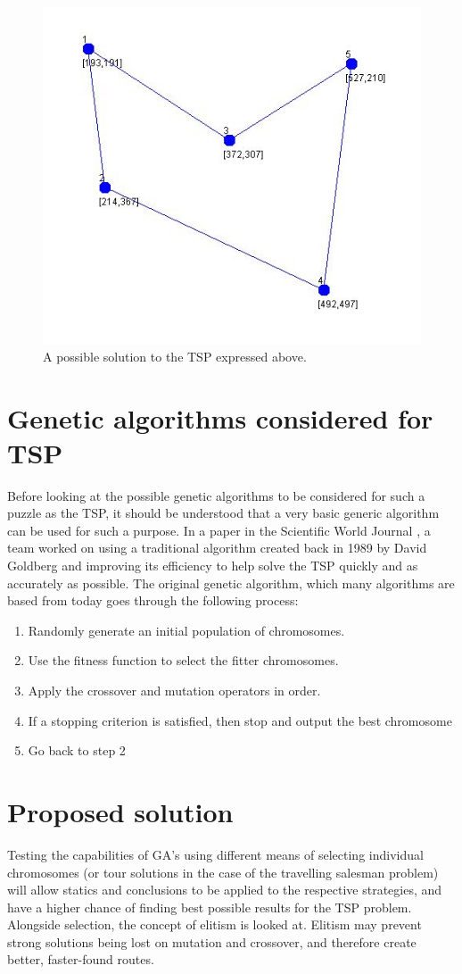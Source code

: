\documentclass[article]{IEEEtran}
\begin{document}
\begin{figure}
\centering
\includegraphics[width=.8\linewidth]{images/solution}
\caption{A possible solution to the TSP expressed above.}
\label{fig:2}
\end{figure}

\section{Genetic algorithms considered for TSP}
Before looking at the possible genetic algorithms to be considered for such a puzzle as the TSP, it should be understood that a very basic generic algorithm can be used for such a purpose. In a paper in the Scientific World Journal \cite{4}, a team worked on using a traditional algorithm created back in 1989 by David Goldberg \cite{5} and improving its efficiency to help solve the TSP quickly and as accurately as possible. The original genetic algorithm, which many algorithms are based from today goes through the following process:
\begin{enumerate}
\item Randomly generate an initial population of chromosomes.
\item Use the fitness function to select the fitter chromosomes.
\item Apply the crossover and mutation operators in order. 
\item If a stopping criterion is satisfied, then stop and output the best chromosome
\item Go back to step 2
\end{enumerate}

\section{Proposed solution}
Testing the capabilities of GA's using different means of selecting individual chromosomes (or tour solutions in the case of the travelling salesman problem) will allow statics and conclusions to be applied to the respective strategies, and have a higher chance of finding best possible results for the TSP problem. Alongside selection, the concept of elitism is looked at. Elitism may prevent strong solutions being lost on mutation and crossover, and therefore create better, faster-found routes. 
\end{document}
